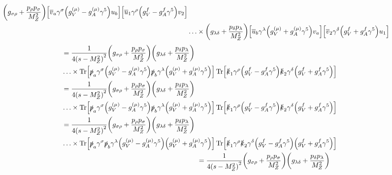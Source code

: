 \documentclass[12 pt,draft]{article}
\renewcommand{\b}[1]{\overline{#1}}
\begin{document}
\begin{problem}[ $\mu\b{\mu}\rightarrow f\b{f}$]
\begin{align}
\begin{split}
				\qty(g_{\sigma\rho}+\frac{p_\rho p_\sigma}{M_Z^2})
				\qty[\b{v}_a\gamma^\sigma\qty(g_V^{(\mu)}-g_A^{(\mu)}\gamma^5)u_b]
				\qty[\b{u}_1\gamma^\rho\qty(g_V^f-g_A^f\gamma^5)v_2]
				\\&\ldots\times
				\qty(g_{\lambda\delta}+\frac{p_\delta p_\lambda}{M_Z^2})
				\qty[\b{u}_b\gamma^\lambda\qty(g_V^{(\mu)}+g_A^{(\mu)}\gamma^5)v_a]
				\qty[\b{v}_2\gamma^\delta\qty(g_V^f+g_A^f\gamma^5)u_1]
			\end{split}
		\end{align}
		\begin{align}
			\begin{split}
				&=\frac{1}{4\qty(s-M_Z^2)^2}
				\qty(g_{\sigma\rho}+\frac{p_\rho p_\sigma}{M_Z^2})
				\qty(g_{\lambda\delta}+\frac{p_\delta p_\lambda}{M_Z^2})
				\\&\ldots\times
				\Tr[\slsh{p}_a\gamma^\sigma\qty(g_V^{(\mu)}-g_A^{(\mu)}\gamma^5)\slsh{p}_b\gamma^\lambda\qty(g_V^{(\mu)}+g_A^{(\mu)}\gamma^5)]
				\Tr[\slsh{k}_1\gamma^\rho\qty(g_V^f-g_A^f\gamma^5)\slsh{k}_2\gamma^\delta\qty(g_V^f+g_A^f\gamma^5)]
			\end{split}
			\\
			\begin{split}
				&=\frac{1}{4\qty(s-M_Z^2)^2}
				\qty(g_{\sigma\rho}+\frac{p_\rho p_\sigma}{M_Z^2})
				\qty(g_{\lambda\delta}+\frac{p_\delta p_\lambda}{M_Z^2})
				\\&\ldots\times
				\Tr[\slsh{p}_a\gamma^\sigma\qty(g_V^{(\mu)}-g_A^{(\mu)}\gamma^5)\slsh{p}_b\gamma^\lambda\qty(g_V^{(\mu)}+g_A^{(\mu)}\gamma^5)]
				\Tr[\slsh{k}_1\gamma^\rho\qty(g_V^f-g_A^f\gamma^5)\slsh{k}_2\gamma^\delta\qty(g_V^f+g_A^f\gamma^5)]
			\end{split}
			\\
			\begin{split}
				&=\frac{1}{4\qty(s-M_Z^2)^2}
				\qty(g_{\sigma\rho}+\frac{p_\rho p_\sigma}{M_Z^2})
				\qty(g_{\lambda\delta}+\frac{p_\delta p_\lambda}{M_Z^2})
				\\&\ldots\times
				\Tr[\slsh{p}_a\gamma^\sigma\slsh{p}_b\gamma^\lambda
				\qty(g_V^{(\mu)}-g_A^{(\mu)}\gamma^5)
				\qty(g_V^{(\mu)}+g_A^{(\mu)}\gamma^5)]
				\Tr[\slsh{k}_1\gamma^\rho
				\slsh{k}_2\gamma^\delta
				\qty(g_V^f-g_A^f\gamma^5)\qty(g_V^f+g_A^f\gamma^5)]
			\end{split}
			\\
			\begin{split}
				&=\frac{1}{4\qty(s-M_Z^2)^2}
				\qty(g_{\sigma\rho}+\frac{p_\rho p_\sigma}{M_Z^2})
				\qty(g_{\lambda\delta}+\frac{p_\delta p_\lambda}{M_Z^2})

\end{split}
\end{align}
\end{problem}
\end{document}
